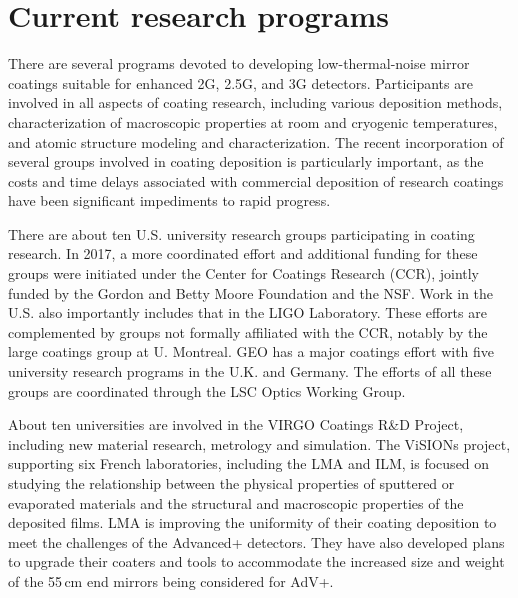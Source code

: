 \section{Current research programs}

There are several 
programs devoted to developing low-thermal-noise mirror coatings suitable for enhanced 2G, 2.5G, and 3G detectors. Participants are involved in all aspects of coating research, including various deposition methods, characterization of macroscopic properties at room and cryogenic temperatures, and atomic structure modeling and characterization. The recent incorporation 
of several groups involved in coating deposition is particularly important, as the costs and time delays associated with commercial deposition of research coatings have been significant impediments to rapid progress.

There are about ten U.S. university research groups participating in 
coating research. In 2017, a more coordinated effort and additional funding for these groups were initiated under the Center for Coatings Research (CCR), jointly funded by the Gordon and Betty Moore Foundation and the NSF. Work in the U.S. also importantly includes that in the LIGO Laboratory. These efforts are complemented by groups not formally affiliated with the CCR, notably by the large coatings group at U. Montreal. GEO has a major coatings effort with five university research programs in the U.K. and Germany. 
The efforts of all these groups are coordinated through 
the LSC Optics Working Group.

About ten universities are involved in the VIRGO Coatings R\&D Project, including new material research, metrology and 
simulation. The ViSIONs project, supporting six French laboratories, including the LMA and ILM, is focused on studying the relationship between the physical properties of sputtered or evaporated materials and the structural and macroscopic properties of the deposited films. 
LMA is improving the uniformity of their coating deposition to meet the challenges of the Advanced+ detectors. They have also developed plans to upgrade their coaters and tools to accommodate the increased size and weight of the 55\,cm end mirrors being considered for AdV+.

